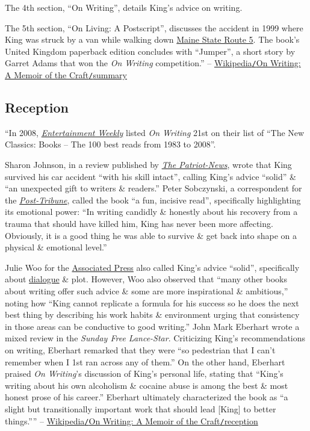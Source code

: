 \documentclass[oneside]{book}
\numberwithin{equation}{section}
\begin{document}
The 4th section, ``On Writing'', details King's advice on writing.

The 5th section, ``On Living: A Postscript'', discusses the accident in 1999 where King was struck by a van while walking down \href{https://en.wikipedia.org/wiki/Maine_State_Route_5}{Maine State Route 5}. The book's United Kingdom paperback edition concludes with ``Jumper'', a short story by Garret Adams that won the \textit{On Writing} competition.'' -- \href{https://en.wikipedia.org/wiki/On_Writing:_A_Memoir_of_the_Craft#Summary}{Wikipedia\texttt{/}On Writing: A Memoir of the Craft\texttt{/}summary}

\subsection{Reception}
``In 2008, \href{https://en.wikipedia.org/wiki/Entertainment_Weekly}{\textit{Entertainment Weekly}} listed \textit{On Writing} 21st on their list of ``The New Classics: Books -- The 100 best reads from 1983 to 2008''.

Sharon Johnson, in a review published by \href{https://en.wikipedia.org/wiki/The_Patriot-News}{\textit{The Patriot-News}}, wrote that King survived his car accident ``with his skill intact'', calling King's advice ``solid'' \& ``an unexpected gift to writers \& readers.'' Peter Sobczynski, a correspondent for the \href{https://en.wikipedia.org/wiki/Post-Tribune_(Indiana_newspaper)}{\textit{Post-Tribune}}, called the book ``a fun, incisive read'', specifically highlighting its emotional power: ``In writing candidly \& honestly about his recovery from a trauma that should have killed him, King has never been more affecting. Obviously, it is a good thing he was able to survive \& get back into shape on a physical \& emotional level.''

Julie Woo for the \href{https://en.wikipedia.org/wiki/Associated_Press}{Associated Press} also called King's advice ``solid'', specifically about \href{https://en.wikipedia.org/wiki/Dialogue}{dialogue} \& plot. However, Woo also observed that ``many other books about writing offer such advice \& some are more inspirational \& ambitious,'' noting how ``King cannot replicate a formula for his success so he does the next best thing by describing his work habits \& environment urging that consistency in those areas can be conductive to good writing.'' John Mark Eberhart wrote a mixed review in the \textit{Sunday Free Lance-Star}. Criticizing King's recommendations on writing, Eberhart remarked that they were ``so pedestrian that I can't remember when I 1st ran across any of them.'' On the other hand, Eberhart praised \textit{On Writing}'s discussion of King's personal life, stating that ``King's writing about his own alcoholism \& cocaine abuse is among the best \& most honest prose of his career.'' Eberhart ultimately characterized the book as ``a slight but transitionally important work that should lead [King] to better things.'''' -- \href{https://en.wikipedia.org/wiki/On_Writing:_A_Memoir_of_the_Craft#Reception}{Wikipedia\texttt{/}On Writing: A Memoir of the Craft\texttt{/}reception}
\end{document}
